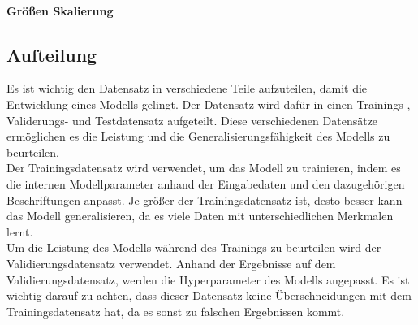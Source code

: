 \paragraph{Größen Skalierung}


\subsection{Aufteilung}
Es ist wichtig den Datensatz in verschiedene Teile aufzuteilen, damit die Entwicklung eines Modells gelingt. Der Datensatz wird dafür in einen Trainings-, Validerungs- und Testdatensatz aufgeteilt. Diese verschiedenen Datensätze ermöglichen es die Leistung und die Generalisierungsfähigkeit des \gls{Modell}s zu beurteilen. \\
Der Trainingsdatensatz wird verwendet, um das Modell zu trainieren, indem es die internen Modellparameter anhand der Eingabedaten und den dazugehörigen Beschriftungen anpasst. Je größer der Trainingsdatensatz ist, desto besser kann das \gls{Modell} generalisieren, da es viele Daten mit unterschiedlichen Merkmalen lernt. \\
Um die Leistung des \gls{Modell}s während des Trainings zu beurteilen wird der Validierungsdatensatz verwendet. Anhand der Ergebnisse auf dem Validierungsdatensatz, werden die Hyperparameter des \gls{Modell}s angepasst. Es ist wichtig darauf zu achten, dass dieser Datensatz keine Überschneidungen mit dem Trainingsdatensatz hat, da es sonst zu falschen Ergebnissen kommt. 